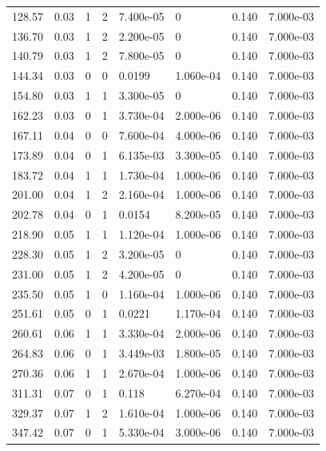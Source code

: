 \documentclass[preview]{standalone}
\begin{document}
{{\begin{tabular}{L{1.2cm}C{1.2cm} C{0.3cm}C{0.5cm} C{1.4cm}C{1.4cm} C{1.4cm}C{1.4cm}}
  128.57  &  0.03  & 1     &  2 &  7.400e-05  & 0  & 0.140 &  7.000e-03   \\ 
  136.70  &  0.03  & 1     &  2 &  2.200e-05  & 0  & 0.140 &  7.000e-03   \\ 
  140.79  &  0.03  & 1     &  2 &  7.800e-05  & 0  & 0.140 &  7.000e-03   \\ 
  144.34  &  0.03  & 0     &  0 &  0.0199  & 1.060e-04  & 0.140 &  7.000e-03   \\ 
  154.80  &  0.03  & 1     &  1 &  3.300e-05  & 0  & 0.140 &  7.000e-03   \\ 
  162.23  &  0.03  & 0     &  1 &  3.730e-04  & 2.000e-06  & 0.140 &  7.000e-03   \\ 
  167.11  &  0.04  & 0     &  0 &  7.600e-04  & 4.000e-06  & 0.140 &  7.000e-03   \\ 
  173.89  &  0.04  & 0     &  1 &  6.135e-03  & 3.300e-05  & 0.140 &  7.000e-03   \\ 
  183.72  &  0.04  & 1     &  1 &  1.730e-04  & 1.000e-06  & 0.140 &  7.000e-03   \\ 
  201.00  &  0.04  & 1     &  2 &  2.160e-04  & 1.000e-06  & 0.140 &  7.000e-03   \\ 
  202.78  &  0.04  & 0     &  1 &  0.0154  & 8.200e-05  & 0.140 &  7.000e-03   \\ 
  218.90  &  0.05  & 1     &  1 &  1.120e-04  & 1.000e-06  & 0.140 &  7.000e-03   \\ 
  228.30  &  0.05  & 1     &  2 &  3.200e-05  & 0  & 0.140 &  7.000e-03   \\ 
  231.00  &  0.05  & 1     &  2 &  4.200e-05  & 0  & 0.140 &  7.000e-03   \\ 
  235.50  &  0.05  & 1     &  0 &  1.160e-04  & 1.000e-06  & 0.140 &  7.000e-03   \\ 
  251.61  &  0.05  & 0     &  1 &  0.0221  & 1.170e-04  & 0.140 &  7.000e-03   \\ 
  260.61  &  0.06  & 1     &  1 &  3.330e-04  & 2.000e-06  & 0.140 &  7.000e-03   \\ 
  264.83  &  0.06  & 0     &  1 &  3.449e-03  & 1.800e-05  & 0.140 &  7.000e-03   \\ 
  270.36  &  0.06  & 1     &  1 &  2.670e-04  & 1.000e-06  & 0.140 &  7.000e-03   \\ 
  311.31  &  0.07  & 0     &  1 &  0.118  & 6.270e-04  & 0.140 &  7.000e-03   \\ 
  329.37  &  0.07  & 1     &  2 &  1.610e-04  & 1.000e-06  & 0.140 &  7.000e-03   \\ 
  347.42  &  0.07  & 0     &  1 &  5.330e-04  & 3.000e-06  & 0.140 &  7.000e-03   \\ 

\end{tabular}}}
\end{document}
